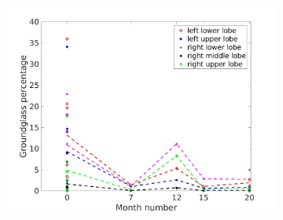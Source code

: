 \begin{figure}[htbp] 
\centering
\begin{subfigure}{.46\linewidth}%
  \includegraphics[width=\linewidth,trim={{.0\wd0} {.0\wd0} {.0\wd0} {.0\wd0}},clip]{QuantitativeAnalysis/Image/GroundglassLobarRegionDiseaseDistributionAverage.jpg} %
  \caption{}
  \label{fig:LobarRegionDiseaseDistributionAverage-a} 
\end{subfigure} 
\hspace{.3in}
\begin{subfigure}{.46\linewidth}%

\end{subfigure}
\end{figure}
